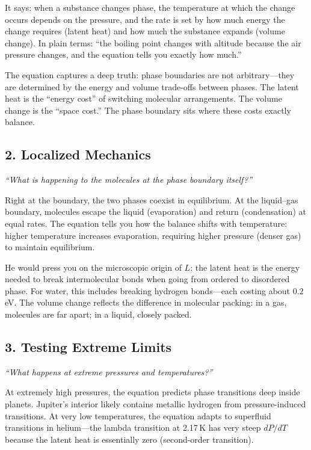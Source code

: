 \documentclass[11pt,openright]{book}
\begin{document}
It says: when a substance changes phase, the temperature at which the change occurs depends on the pressure, and the rate is set by how much energy the change requires (latent heat) and how much the substance expands (volume change). In plain terms: ``the boiling point changes with altitude because the air pressure changes, and the equation tells you exactly how much.''

The equation captures a deep truth: phase boundaries are not arbitrary---they are determined by the energy and volume trade-offs between phases. The latent heat is the ``energy cost'' of switching molecular arrangements. The volume change is the ``space cost.'' The phase boundary sits where these costs exactly balance.

\subsection*{2. Localized Mechanics}
\textit{``What is happening to the molecules at the phase boundary itself?''}

Right at the boundary, the two phases coexist in equilibrium. At the liquid--gas boundary, molecules escape the liquid (evaporation) and return (condensation) at equal rates. The equation tells you how the balance shifts with temperature: higher temperature increases evaporation, requiring higher pressure (denser gas) to maintain equilibrium.

He would press you on the microscopic origin of $L$: the latent heat is the energy needed to break intermolecular bonds when going from ordered to disordered phase. For water, this includes breaking hydrogen bonds---each costing about $0.2$\,eV. The volume change reflects the difference in molecular packing: in a gas, molecules are far apart; in a liquid, closely packed.

\subsection*{3. Testing Extreme Limits}
\textit{``What happens at extreme pressures and temperatures?''}

At extremely high pressures, the equation predicts phase transitions deep inside planets. Jupiter's interior likely contains metallic hydrogen from pressure-induced transitions. At very low temperatures, the equation adapts to superfluid transitions in helium---the lambda transition at 2.17\,K has very steep $dP/dT$ because the latent heat is essentially zero (second-order transition).
\end{document}

